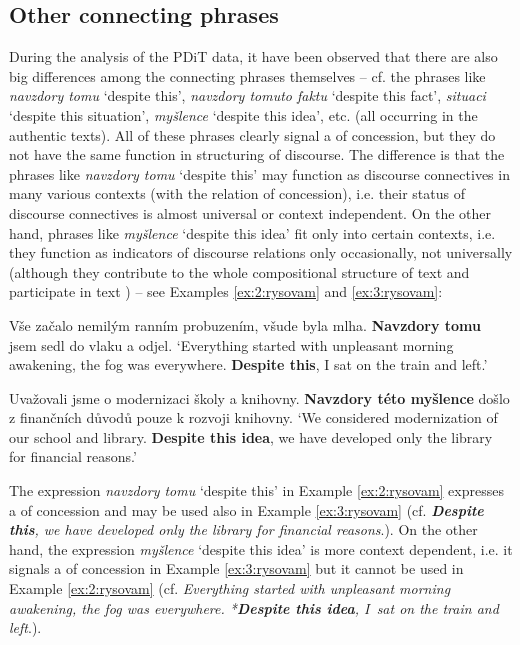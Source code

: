 \documentclass[output=paper]{langsci/langscibook.cls}
\begin{document}
\subsection{Other connecting phrases}

During the analysis of the PDiT data, it have been observed that there are also big differences among the  connecting phrases themselves -- cf. the phrases like \textit{navzdory tomu} `despite this', \textit{navzdory tomuto faktu} `despite this fact', \textit{ situaci} `despite this situation', \textit{ myšlence} `despite this idea', etc. (all occurring in the authentic  texts). All of these phrases clearly signal a  of concession, but they do not have the same function in structuring of discourse. The difference is that the phrases like \textit{navzdory tomu} `despite this' may function as discourse connectives in many various contexts (with the relation of concession), i.e. their status of discourse connectives is almost universal or context independent. On the other hand, phrases like \textit{ myšlence} `despite this idea' fit only into certain contexts, i.e. they function as indicators of discourse relations only occasionally, not universally (although they contribute to the whole compositional structure of text and participate in text ) – see Examples \ref{ex:2:rysovam} and \ref{ex:3:rysovam}:

\ea
\label{ex:2:rysovam}
 Vše začalo nemilým ranním probuzením, všude byla mlha. \textbf{Navzdory tomu}  jsem sedl do vlaku a odjel. 
\glt `Everything started with unpleasant morning awakening, the fog was everywhere. \textbf{Despite this}, I sat on the train and left.'
\z

\largerpage
\ea
\label{ex:3:rysovam}
Uvažovali jsme o modernizaci školy a knihovny. \textbf{Navzdory této myšlence} došlo z finančních důvodů pouze k rozvoji knihovny.
\glt `We considered modernization of our school and library. \textbf{Despite this idea}, we have developed only the library for financial reasons.'
\z

The expression \textit{navzdory tomu} `despite this' in Example \ref{ex:2:rysovam} expresses a  of concession and may be used also in Example \ref{ex:3:rysovam} (cf. \textbf{\textit{Despite this}}\textit{, we have developed only the library for financial reasons}.). On the other hand, the expression \textit{ myšlence} `despite this idea' is more context dependent, i.e. it signals a  of concession in Example \ref{ex:3:rysovam} but it cannot be used in Example \ref{ex:2:rysovam} (cf. \textit{Everything started with unpleasant morning awakening, the fog was everywhere. *}\textbf{\textit{Despite this idea}}\textit{, I~sat on the train and left}.).
\end{document}
